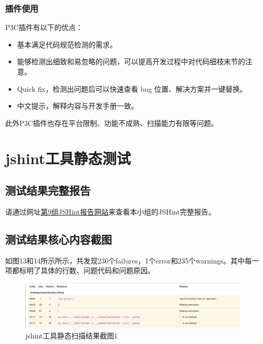 \documentclass[hyperref, a4paper]{ctexart}
\providecommand{\tightlist}{%
  \setlength{\itemsep}{0pt}\setlength{\parskip}{0pt}}
\begin{document}
\hypertarget{ux63d2ux4ef6ux4f7fux7528}{%
\subsubsection{插件使用}\label{ux63d2ux4ef6ux4f7fux7528}}

P3C插件有以下的优点：

\begin{itemize}
\tightlist
\item
  基本满足代码规范检测的需求。
\item
  能够检测出细致和易忽略的问题，可以提高开发过程中对代码细枝末节的注意。
\item
  Quick fix，检测出问题后可以快速查看 bug 位置、解决方案并一键替换。
\item
  中文提示，解释内容与开发手册一致。
\end{itemize}

此外P3C插件也存在平台限制、功能不成熟、扫描能力有限等问题。

\hypertarget{jshintux5de5ux5177ux9759ux6001ux6d4bux8bd5}{%
\section{jshint工具静态测试}\label{jshintux5de5ux5177ux9759ux6001ux6d4bux8bd5}}

\hypertarget{ux6d4bux8bd5ux7ed3ux679cux5b8cux6574ux62a5ux544a-2}{%
\subsection{测试结果完整报告}\label{ux6d4bux8bd5ux7ed3ux679cux5b8cux6574ux62a5ux544a-2}}

请通过网址\href{https://straybird-atsh.github.io/SoftwareQA-Testing/JSHintReport.html}{第9组JSHint报告网站}来查看本小组的JSHint完整报告。

\hypertarget{ux6d4bux8bd5ux7ed3ux679cux6838ux5fc3ux5185ux5bb9ux622aux56fe-2}{%
\subsection{测试结果核心内容截图}\label{ux6d4bux8bd5ux7ed3ux679cux6838ux5fc3ux5185ux5bb9ux622aux56fe-2}}

如图13和14所示所示，共发现236个failures，1个error和235个warnings。其中每一项都标明了具体的行数、问题代码和问题原因。

\begin{figure}
\centering
\includegraphics{screenshots/pic3.jpg}
\caption{jshint工具静态扫描结果截图1}
\end{figure}
\end{document}
